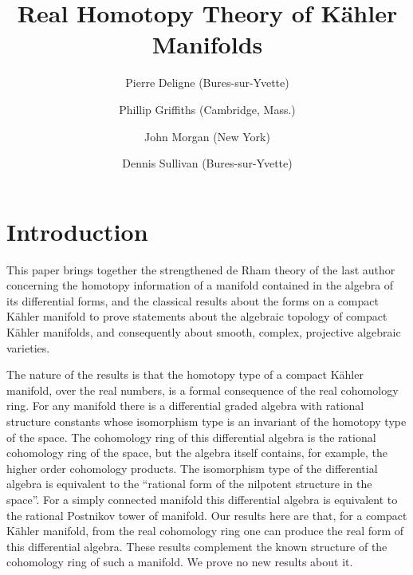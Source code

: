 \documentclass[11pt]{amsart}
\title{Real Homotopy Theory of K\"ahler Manifolds}
\author[P. Deligne, P. Griffiths, J. Morgan, and D. Sullivan]{Pierre Deligne (Bures-sur-Yvette)}
\author[]{Phillip Griffiths (Cambridge, Mass.)}
\author[]{John Morgan (New York)}
\author[]{Dennis Sullivan (Bures-sur-Yvette)}
\date{}
\theoremstyle{plain}
\theoremstyle{definition}
\begin{document}
\maketitle

\tableofcontents

\section*{Introduction}

This paper brings together the strengthened de Rham theory of the last author \cite{S1,S2,S3} concerning the homotopy information of a manifold contained in the algebra of its differential forms, and the classical results \cite{W} about the forms on a compact K\"ahler manifold to prove statements about the algebraic topology of compact K\"ahler manifolds, and consequently about smooth, complex, projective algebraic varieties.

The nature of the results is that the homotopy type of a compact K\"ahler manifold, over the real numbers, is a formal consequence of the real cohomology ring. For any manifold there is a differential graded algebra with rational structure constants whose isomorphism type is an invariant of the homotopy type of the space. The cohomology ring of this differential algebra is the rational cohomology ring of the space, but the algebra itself contains, for example, the higher order cohomology products. The isomorphism type of the differential algebra is equivalent to the ``rational form of the nilpotent structure in the space''. For a simply connected manifold this differential algebra is equivalent to the rational Postnikov tower of manifold. Our results here are that, for a compact K\"ahler manifold, from the real cohomology ring one can produce the real form of this differential algebra. These results complement the known structure of the cohomology ring of such a manifold. We prove no new results about it.
\end{document}

